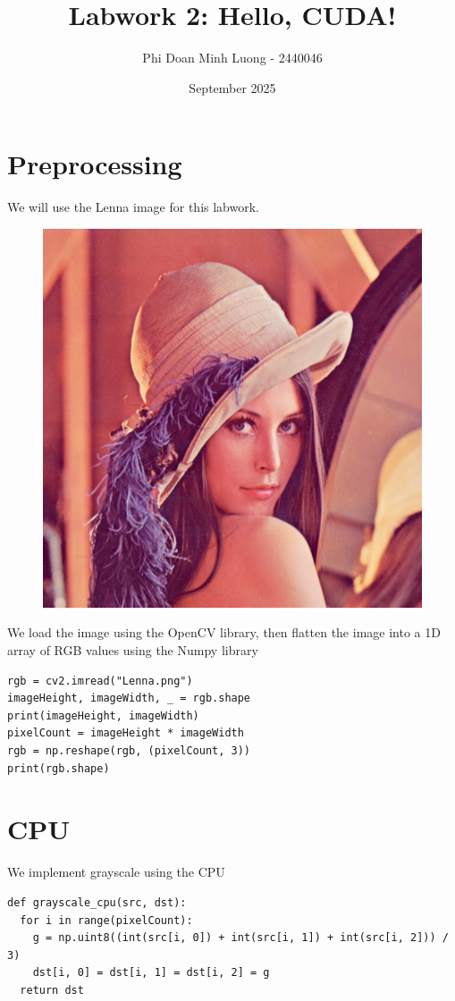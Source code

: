 \documentclass{article}
\title{Labwork 2: Hello, CUDA!}
\author{Phi Doan Minh Luong - 2440046}
\date{September 2025}
\begin{document}
\maketitle

\setlength\parindent{0pt}

\section{Preprocessing}
We will use the Lenna image for this labwork.
\begin{figure}[h]
    \centering
    \includegraphics[width=0.5\linewidth]{Lenna.png}
\end{figure}

We load the image using the OpenCV library, then flatten the image into a 1D array of RGB values using the Numpy library

\begin{lstlisting}
rgb = cv2.imread("Lenna.png")
imageHeight, imageWidth, _ = rgb.shape
print(imageHeight, imageWidth)
pixelCount = imageHeight * imageWidth
rgb = np.reshape(rgb, (pixelCount, 3))
print(rgb.shape)
\end{lstlisting}

\section{CPU}
We implement grayscale using the CPU
\begin{lstlisting}
def grayscale_cpu(src, dst):
  for i in range(pixelCount):
    g = np.uint8((int(src[i, 0]) + int(src[i, 1]) + int(src[i, 2])) / 3)
    dst[i, 0] = dst[i, 1] = dst[i, 2] = g
  return dst
\end{lstlisting}
\end{document}
